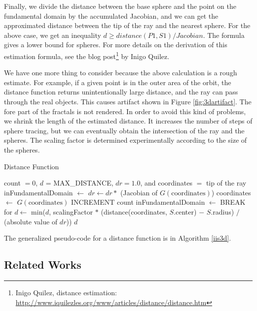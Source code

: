 Finally, we divide the distance between the base sphere and the point on
the fundamental domain by the accumulated Jacobian, and we can get the
approximated distance between the tip of the ray and the nearest sphere.
For the above case, we get an inequality $d \geq distance(P1, S1)/Jacobian$.
The formula gives a lower bound for spheres.
For more details on the derivation of this estimation formula, see the
blog post\footnote{Inigo Quilez, distance estimation:
\url{http://www.iquilezles.org/www/articles/distance/distance.htm}}
by Inigo Quilez.

We have one more thing to consider because the above calculation is
a rough estimate.
For example, if a given point is in the outer area of the orbit, the
distance function returns unintentionally large distance, and the ray
can pass through the real objects. This causes artifact shown in Figure
\ref{fig:3dartifact}. The fore part of the fractals is not rendered.
In order to avoid this kind of problems, we shrink the length of
the estimated distance.
It increases the number of steps of sphere tracing, but we can
eventually obtain the intersection of the ray and the spheres.
The scaling factor is determined experimentally according to the size of
the spheres.

\begin{algorithm}
 \caption{Distance Function}
 \label{iis3d}
 \begin{algorithmic}
  \REQUIRE count $= 0$, $d$ = MAX\_DISTANCE, $dr = 1.0$, and coordinates
  $=$ tip of the ray
  \STATE inFundamentalDomain $\leftarrow$ \TRUE
  \STATE $dr \leftarrow dr * $ (Jacobian of $G(\text{coordinates})$)
  \STATE coordinates $\leftarrow$ $G(\text{coordinates})$
  \STATE INCREMENT count
  \STATE inFundamentalDomain $\leftarrow$ \FALSE
  \ENDIF
  \ENDFOR
  \STATE BREAK for
  \ENDIF
  \ENDFOR
  \STATE $d \leftarrow$ min($d$, scalingFactor $*$ (distance(coordinates, $S$.center) $-$
  $S$.radius) $/$ (absolute value of $dr$))
  \ENDFOR
  \RETURN $d$
 \end{algorithmic}
\end{algorithm}

The generalized pseudo-code for a distance function is in Algorithm \ref{iis3d}. 

\subsection{Related Works}


